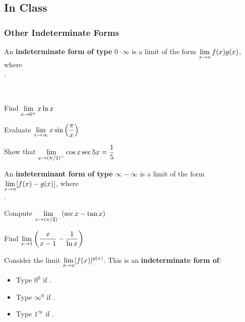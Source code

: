 \documentclass[notes]{subfiles}
\begin{document}
	\subsection*{In Class}
	\subsubsection*{Other Indeterminate Forms}
		\begin{defn}
			An \textbf{indeterminate form of type} \(0\cdot \infty\) is a limit of the form \(\displaystyle \lim_{x\to a} f(x)g(x)\), where\\[20pt] .
		\end{defn}
		
		\begin{rmk}
			\\[40pt]
		\end{rmk}
		
		\begin{ex}
			Find \(\displaystyle\lim_{x\to 0^+} x\ln x\)
		\end{ex}
			
		\begin{ex}
			Evaluate \(\displaystyle\lim_{x\to \infty} x\sin\left( \dfrac{\pi}{x}\right)\)
		\end{ex}
			
		\begin{ex}
			Show that \(\displaystyle \lim_{x\to (\pi/2)^-} \cos x\sec 5x = \dfrac{1}{5}\)
		\end{ex}
			\newpage
		
		\begin{defn}
			An \textbf{indeterminant form of type} \(\infty - \infty\) is a limit of the form \(\displaystyle \lim_{x\to a}[f(x) - g(x)]\), where\\[20pt] .
		\end{defn}	
		
		\begin{ex}
			Compute \(\displaystyle \lim_{x\to (\pi/2)^-} (\sec x - \tan x)\)
		\end{ex}
			
		\begin{ex}
			Find \(\displaystyle \lim_{x\to 1} \left( \dfrac{x}{x-1} -\dfrac{1}{\ln x}\right)\)
		\end{ex}
			\newpage
			
		\begin{defn}
			Consider the limit \(\displaystyle \lim_{x\to a} [f(x)]^{g(x)}\).  This is an \textbf{indeterminate form of}: \\
			\begin{itemize}
				\setlength\itemsep{30pt}
				\item Type \(0^0\) if .
				\item Type \(\infty^0\) if .
				\item Type \(1^\infty\) if .
			\end{itemize}
		\end{defn}
		
\end{document}
